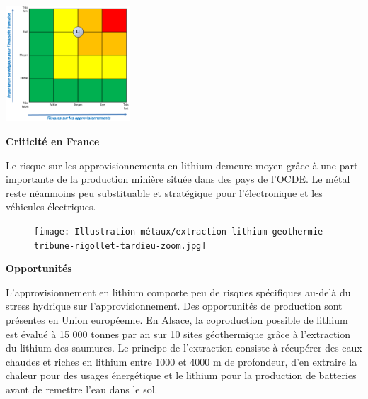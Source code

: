 \begin{multicols}{2}
    \begin{center}
      \includegraphics[width=0.35\textwidth]{Illustration métaux/Lithium_criticité.png} 
    \end{center}
    \begin{center}
    \textbf{Criticité en France}
    \end{center}
    Le risque sur les approvisionnements en lithium demeure moyen grâce à une part importante de la production minière située dans des pays de l'OCDE. Le métal reste néanmoins peu substituable et stratégique pour l'électronique et les véhicules électriques.
\end{multicols}
\begin{figure}
  \begin{center}
    \texttt{[image: Illustration métaux/extraction-lithium-geothermie-tribune-rigollet-tardieu-zoom.jpg]}
  \end{center}
\end{figure}
\begin{center}
    \textbf{Opportunités}
\end{center}

L'approvisionnement en lithium comporte peu de risques spécifiques au-delà du stress hydrique sur l'approvisionnement. Des opportunités de production sont présentes en Union européenne. En Alsace, la coproduction possible de lithium est évalué à 15 000 tonnes par an sur 10 sites géothermique grâce à l'extraction du lithium des saumures. Le principe de l'extraction consiste à récupérer des eaux chaudes et riches en lithium entre 1000 et 4000 m de profondeur, d'en extraire la chaleur pour des usages énergétique et le lithium pour la production de batteries avant de remettre l'eau dans le sol.


